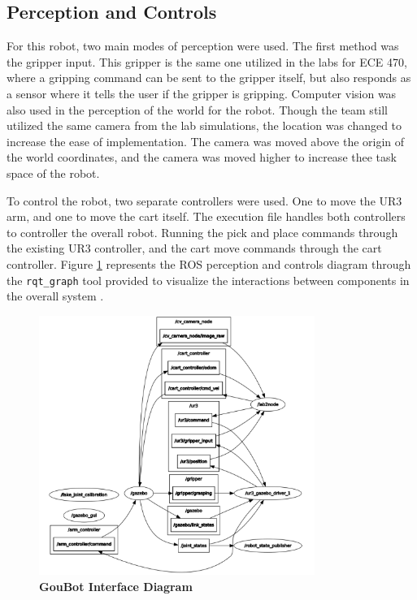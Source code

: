         
    
    \subsection{Perception and Controls}
        
        For this robot, two main modes of perception were used. The first method was the gripper input. This gripper is the same one utilized in the labs for ECE 470, where a gripping command can be sent to the gripper itself, but also responds as a sensor where it tells the user if the gripper is gripping. Computer vision was also used in the perception of the world for the robot. Though the team still utilized the same camera from the lab simulations, the location was changed to increase the ease of implementation. The camera was moved above the origin of the world coordinates, and the camera was moved higher to increase thee task space of the robot. 
        
        To control the robot, two separate controllers were used. One to move the UR3 arm, and one to move the cart itself. The execution file handles both controllers to controller the overall robot. Running the pick and place commands through the existing UR3 controller, and the cart move commands through the cart controller. Figure \ref{fig:block_diagram} represents the ROS perception and controls diagram through the \lstinline!rqt_graph! tool provided to visualize the interactions between components in the overall system \cite{ros_concept}. 
        
        \begin{figure}[h]
        	\begin{center}
        	\includegraphics[width=0.8\textwidth]{pictures/block_diagram.png}
        	\caption{\textbf{GouBot Interface Diagram}}
        	\label{fig:block_diagram}
        	\end{center}
        \end{figure}
    
